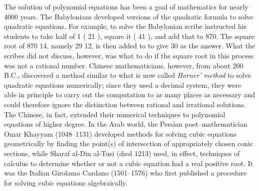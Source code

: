 \documentclass[11pt,oneside]{article}
\begin{document}
\begin{BookBody}

\noindent The solution of polynomial equations has been a goal of mathematics for nearly 4000 years. The Babylonians developed versions of the quadratic formula to solve quadratic equations. For example, to solve  the Babylonian scribe instructed his students to take half of 1 ( 21 ), square it ( 41 ), and add that to 870. The square root of 870 14, namely 29 12, is then added to  to give 30 as the answer. What the scribes did not discuss, however, was what to do if the square root in this process was not a rational number. Chinese mathematicians, however, from about 200 B.C., discovered a method similar to what is now called\textit{ Horner’} \textit{method} to solve quadratic equations numerically; since they used a decimal system, they were able in principle to carry out the computation to as many places as necessary and could therefore ignore the distinction between rational and irrational solutions. The Chinese, in fact, extended their numerical techniques to polynomial equations of higher degree. In the Arab world, the Persian poet–mathematician Omar Khayyam (1048–1131) developed methods for solving cubic equations geometrically by finding the point(s) of intersection of appropriately chosen conic sections, while Sharaf al-Din al-Tusi (died 1213) used, in effect, techniques of calculus to determine whether or not a cubic equation had a real positive root. It was the Italian Girolamo Cardano (1501–1576) who first published a procedure for solving cubic equations algebraically.

\end{BookBody}

\BookNarrativetrue
\end{document}
